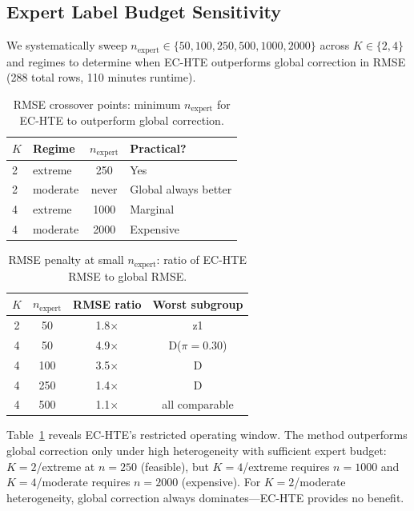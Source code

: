 \documentclass[11pt,twocolumn]{article}
\begin{document}
\subsection{Expert Label Budget Sensitivity}
\label{sec:budget}

We systematically sweep $n_{\text{expert}} \in \{50, 100, 250, 500, 1000, 2000\}$ across $K \in \{2, 4\}$ and regimes to determine when EC-HTE outperforms global correction in RMSE (288 total rows, 110 minutes runtime).

\begin{table}[t]
\centering
\small
\caption{RMSE crossover points: minimum $n_{\text{expert}}$ for EC-HTE to outperform global correction.}
\label{tab:crossover}
\begin{tabular}{@{}llcl@{}}
\toprule
$K$ & Regime & $n_{\text{expert}}$ & Practical? \\
\midrule
2 & extreme & 250 & Yes \\
2 & moderate & never & Global always better \\
4 & extreme & 1000 & Marginal \\
4 & moderate & 2000 & Expensive \\
\bottomrule
\end{tabular}
\end{table}

\begin{table}[t]
\centering
\small
\caption{RMSE penalty at small $n_{\text{expert}}$: ratio of EC-HTE RMSE to global RMSE.}
\label{tab:penalty}
\begin{tabular}{@{}cccc@{}}
\toprule
$K$ & $n_{\text{expert}}$ & RMSE ratio & Worst subgroup \\
\midrule
2 & 50 & 1.8$\times$ & z1 \\
4 & 50 & 4.9$\times$ & D($\pi{=}0.30$) \\
4 & 100 & 3.5$\times$ & D \\
4 & 250 & 1.4$\times$ & D \\
4 & 500 & 1.1$\times$ & all comparable \\
\bottomrule
\end{tabular}
\end{table}

Table~\ref{tab:crossover} reveals EC-HTE's restricted operating window. The method outperforms global correction only under high heterogeneity with sufficient expert budget: $K{=}2$/extreme at $n{=}250$ (feasible), but $K{=}4$/extreme requires $n{=}1000$ and $K{=}4$/moderate requires $n{=}2000$ (expensive). For $K{=}2$/moderate heterogeneity, global correction always dominates---EC-HTE provides no benefit.
\end{document}
